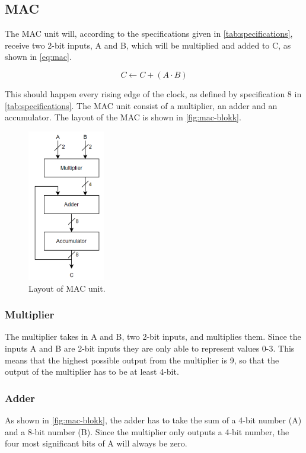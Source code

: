 \subsection{MAC}
\label{subsec:MAC_theory}

The MAC unit will, according to the specifications given in \autoref{tab:specifications}, receive two 2-bit inputs, A and B, which will be multiplied and added to C, as shown in \autoref{eq:mac}. 

\begin{equation}
    \label{eq:mac}
    C \leftarrow C + (A \cdot B)
\end{equation}

 This should happen every rising edge of the clock, as defined by specification 8 in \autoref{tab:specifications}. The MAC unit consist of a multiplier, an adder and an accumulator. The layout of the MAC is shown in \autoref{fig:mac-blokk}. 

\begin{figure}[htpb]
    \centering
    \includegraphics[width=0.3\textwidth]{Figures/mac-blokk.png}
    \caption{Layout of MAC unit.}
    \label{fig:mac-blokk}
\end{figure}


\subsubsection{Multiplier}
The multiplier takes in A and B, two 2-bit inputs, and multiplies them. Since the inputs A and B are 2-bit inputs they are only able to represent values 0-3. This means that the highest possible output from the multiplier is 9, so that the output of the multiplier has to be at least 4-bit. 

\subsubsection{Adder}
As shown in \autoref{fig:mac-blokk}, the adder has to take the sum of a 4-bit number (A) and a 8-bit number (B). Since the multiplier only outputs a 4-bit number, the four most significant bits of A will always be zero. 

